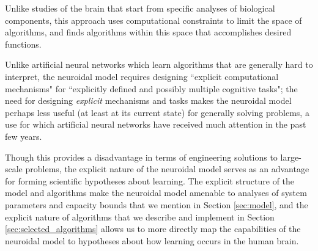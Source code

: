 \documentclass[letterpaper, 12pt]{article}
\begin{document}
Unlike studies of the brain that start from specific analyses of biological components, this approach uses computational constraints to limit the space of algorithms, and finds algorithms within this space that accomplishes desired functions.

Unlike artificial neural networks which learn algorithms that are generally hard to interpret, the neuroidal model requires designing ``explicit computational mechanisms" for ``explicitly defined and possibly multiple cognitive tasks"; the need for designing \textit{explicit} mechanisms and tasks makes the neuroidal model perhaps less useful (at least at its current state) for generally solving problems, a use for which artificial neural networks have received much attention in the past few years.

Though this provides a disadvantage in terms of engineering solutions to large-scale problems, the explicit nature of the neuroidal model serves as an advantage for forming scientific hypotheses about learning. The explicit structure of the model and algorithms make the neuroidal model amenable to analyses of system parameters and capacity bounds that we mention in Section \ref{sec:model}, and the explicit nature of algorithms that we describe and implement in Section \ref{sec:selected_algorithms} allows us to more directly map the capabilities of the neuroidal model to hypotheses about how learning occurs in the human brain.



\end{document}
